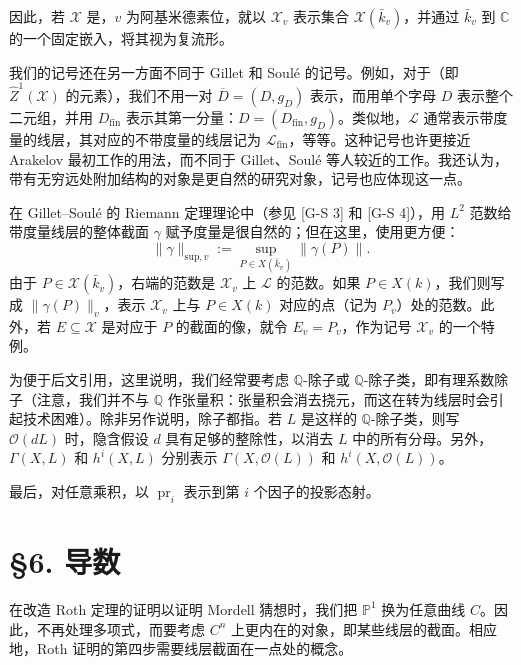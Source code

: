 因此，若 $\mathscr X$ 是，$v$ 为阿基米德素位，就以 $\mathscr X_v$ 表示集合 $\mathscr X(\bar k_v)$，并通过 $\bar k_v$ 到 $\mathbb C$ 的一个固定嵌入，将其视为复流形。

我们的记号还在另一方面不同于 Gillet 和 Soulé 的记号。例如，对于（即 $\widehat Z^1(\mathscr X)$ 的元素），我们不用一对 $\overline D=(D,g_D)$ 表示，而用单个字母 $D$ 表示整个二元组，并用 $D_{\mathrm{fin}}$ 表示其第一分量：$D=(D_{\mathrm{fin}},g_D)$。类似地，$\mathscr L$ 通常表示带度量的线层，其对应的不带度量的线层记为 $\mathscr L_{\mathrm{fin}}$，等等。这种记号也许更接近 Arakelov 最初工作的用法，而不同于 Gillet、Soulé 等人较近的工作。我还认为，带有无穷远处附加结构的对象是更自然的研究对象，记号也应体现这一点。

在 Gillet--Soulé 的 Riemann 定理理论中（参见 [G-S 3] 和 [G-S 4]），用 $L^2$ 范数给带度量线层的整体截面 $\gamma$ 赋予度量是很自然的；但在这里，使用更方便：
\[
\|\gamma\|_{\mathrm{sup},v}:=
\sup_{P\in X(\bar k_v)}\|\gamma(P)\|.
\]
由于 $P\in\mathscr X(\bar k_v)$，右端的范数是 $\mathscr X_v$ 上 $\mathscr L$ 的范数。如果 $P\in X(k)$，我们则写成 $\|\gamma(P)\|_v$，表示 $\mathscr X_v$ 上与 $P\in X(k)$ 对应的点（记为 $P_v$）处的范数。此外，若 $E\subseteq\mathscr X$ 是对应于 $P$ 的截面的像，就令 $E_v=P_v$，作为记号 $\mathscr X_v$ 的一个特例。

为便于后文引用，这里说明，我们经常要考虑 $\mathbb Q$-除子或 $\mathbb Q$-除子类，即有理系数除子（注意，我们并不与 $\mathbb Q$ 作张量积：张量积会消去挠元，而这在转为线层时会引起技术困难）。除非另作说明，除子都指。若 $L$ 是这样的 $\mathbb Q$-除子类，则写 $\mathcal O(dL)$ 时，隐含假设 $d$ 具有足够的整除性，以消去 $L$ 中的所有分母。另外，$\Gamma(X,L)$ 和 $h^i(X,L)$ 分别表示 $\Gamma(X,\mathcal O(L))$ 和 $h^i(X,\mathcal O(L))$。

最后，对任意乘积，以 $\operatorname{pr}_i$ 表示到第 $i$ 个因子的投影态射。

\section*{§6. 导数}
在改造 Roth 定理的证明以证明 Mordell 猜想时，我们把 $\mathbb P^1$ 换为任意曲线 $C$。因此，不再处理多项式，而要考虑 $C^n$ 上更内在的对象，即某些线层的截面。相应地，Roth 证明的第四步需要线层截面在一点处的概念。

